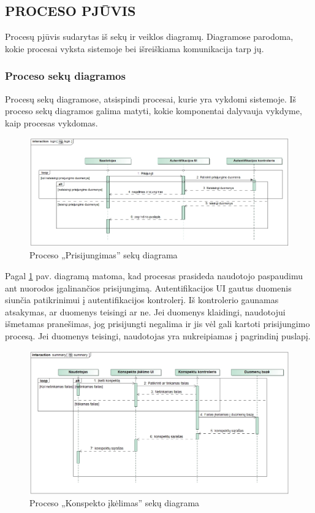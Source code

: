 \documentclass{VUMIFPSkursinis}
\begin{document}
	\subsection{PROCESO PJŪVIS}
	Procesų pjūvis sudarytas iš sekų ir veiklos diagramų. Diagramose parodoma, kokie procesai
	vyksta sistemoje bei išreiškiama komunikacija tarp jų.
	\subsubsection{Proceso sekų diagramos}
	Procesų sekų diagramose, atsispindi procesai, kurie yra vykdomi sistemoje. Iš proceso
	sekų diagramos galima matyti, kokie komponentai dalyvauja vykdyme, kaip procesas vykdomas.
	\begin{figure}[H]
		\centering
		\includegraphics[width=\linewidth]{img/login.jpg}
		\caption{Proceso „Prisijungimas” sekų diagrama}
		\label{fig:login}
	\end{figure}
	Pagal \ref{fig:login} pav. diagramą matoma, kad procesas prasideda naudotojo paspaudimu ant nuorodos įgalinančios prisijungimą. Autentifikacijos
	UI gautus duomenis siunčia patikrinimui į autentifikacijos kontrolerį. Iš kontrolerio
	gaunamas atsakymas, ar duomenys teisingi ar ne. Jei duomenys klaidingi, naudotojui išmetamas pranešimas,
	jog prisijungti negalima ir jis vėl gali kartoti prisijungimo procesą. Jei duomenys teisingi,
	naudotojas yra nukreipiamas į pagrindinį puslapį.
	\begin{figure}[H]
		\centering
		\includegraphics[width=\linewidth]{img/summary.jpg}
		\caption{Proceso „Konspekto įkėlimas” sekų diagrama}
		\label{fig:summary}
	\end{figure}
\end{document}
